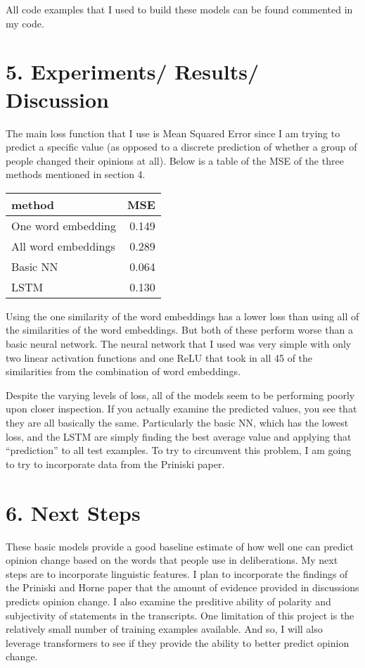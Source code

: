 \documentclass[12pt,]{article}
\begin{document}
All code examples that I used to build these models can be found
commented in my code.

\hypertarget{experiments-results-discussion}{%
\section{5. Experiments/ Results/
Discussion}\label{experiments-results-discussion}}

The main loss function that I use is Mean Squared Error since I am
trying to predict a specific value (as opposed to a discrete prediction
of whether a group of people changed their opinions at all). Below is a
table of the MSE of the three methods mentioned in section 4.

\begin{longtable}[]{@{}lr@{}}
\toprule
method & MSE\tabularnewline
\midrule
\endhead
One word embedding & 0.149\tabularnewline
All word embeddings & 0.289\tabularnewline
Basic NN & 0.064\tabularnewline
LSTM & 0.130\tabularnewline
\bottomrule
\end{longtable}

Using the one similarity of the word embeddings has a lower loss than
using all of the similarities of the word embeddings. But both of these
perform worse than a basic neural network. The neural network that I
used was very simple with only two linear activation functions and one
ReLU that took in all 45 of the similarities from the combination of
word embeddings.

Despite the varying levels of loss, all of the models seem to be
performing poorly upon closer inspection. If you actually examine the
predicted values, you see that they are all basically the same.
Particularly the basic NN, which has the lowest loss, and the LSTM are
simply finding the best average value and applying that ``prediction''
to all test examples. To try to circumvent this problem, I am going to
try to incorporate data from the Priniski paper.

\hypertarget{next-steps}{%
\section{6. Next Steps}\label{next-steps}}

These basic models provide a good baseline estimate of how well one can
predict opinion change based on the words that people use in
deliberations. My next steps are to incorporate linguistic features. I
plan to incorporate the findings of the Priniski and Horne paper that
the amount of evidence provided in discussions predicts opinion change.
I also examine the preditive ability of polarity and subjectivity of
statements in the transcripts. One limitation of this project is the
relatively small number of training examples available. And so, I will
also leverage transformers to see if they provide the ability to better
predict opinion change.
\end{document}
